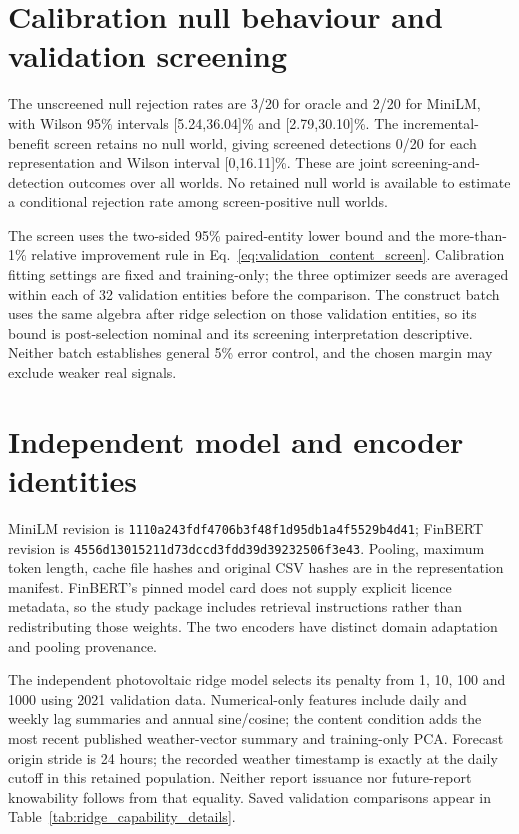 \section{Calibration null behaviour and validation screening}

The unscreened null rejection rates are 3/20 for oracle and 2/20 for MiniLM, with Wilson 95\% intervals [5.24,36.04]\% and [2.79,30.10]\%. The incremental-benefit screen retains no null world, giving screened detections 0/20 for each representation and Wilson interval [0,16.11]\%. These are joint screening-and-detection outcomes over all worlds. No retained null world is available to estimate a conditional rejection rate among screen-positive null worlds.

The screen uses the two-sided 95\% paired-entity lower bound and the more-than-1\% relative improvement rule in Eq.~\ref{eq:validation_content_screen}. Calibration fitting settings are fixed and training-only; the three optimizer seeds are averaged within each of 32 validation entities before the comparison. The construct batch uses the same algebra after ridge selection on those validation entities, so its bound is post-selection nominal and its screening interpretation descriptive. Neither batch establishes general 5\% error control, and the chosen margin may exclude weaker real signals.

\section{Independent model and encoder identities}

MiniLM revision is \nolinkurl{1110a243fdf4706b3f48f1d95db1a4f5529b4d41}; FinBERT revision is \nolinkurl{4556d13015211d73dccd3fdd39d39232506f3e43}. Pooling, maximum token length, cache file hashes and original CSV hashes are in the representation manifest. FinBERT's pinned model card does not supply explicit licence metadata, so the study package includes retrieval instructions rather than redistributing those weights. The two encoders have distinct domain adaptation and pooling provenance.

The independent photovoltaic ridge model selects its penalty from 1, 10, 100 and 1000 using 2021 validation data. Numerical-only features include daily and weekly lag summaries and annual sine/cosine; the content condition adds the most recent published weather-vector summary and training-only PCA. Forecast origin stride is 24 hours; the recorded weather timestamp is exactly at the daily cutoff in this retained population. Neither report issuance nor future-report knowability follows from that equality. Saved validation comparisons appear in Table~\ref{tab:ridge_capability_details}.
